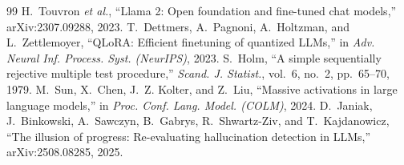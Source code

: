 \documentclass[conference]{IEEEtran}
\begin{document}
\begin{thebibliography}{99}
 H.~Touvron \emph{et al.}, ``Llama 2: Open foundation and fine-tuned chat models,'' arXiv:2307.09288, 2023.
 T.~Dettmers, A.~Pagnoni, A.~Holtzman, and L.~Zettlemoyer, ``QLoRA: Efficient finetuning of quantized LLMs,'' in \emph{Adv. Neural Inf. Process. Syst. (NeurIPS)}, 2023.
 S.~Holm, ``A simple sequentially rejective multiple test procedure,'' \emph{Scand. J. Statist.}, vol.~6, no.~2, pp.~65--70, 1979.
 M.~Sun, X.~Chen, J.~Z. Kolter, and Z.~Liu, ``Massive activations in large language models,'' in \emph{Proc. Conf. Lang. Model. (COLM)}, 2024.
 D.~Janiak, J.~Binkowski, A.~Sawczyn, B.~Gabrys, R.~Shwartz-Ziv, and T.~Kajdanowicz, ``The illusion of progress: Re-evaluating hallucination detection in LLMs,'' arXiv:2508.08285, 2025.
\end{thebibliography}
\end{document}
